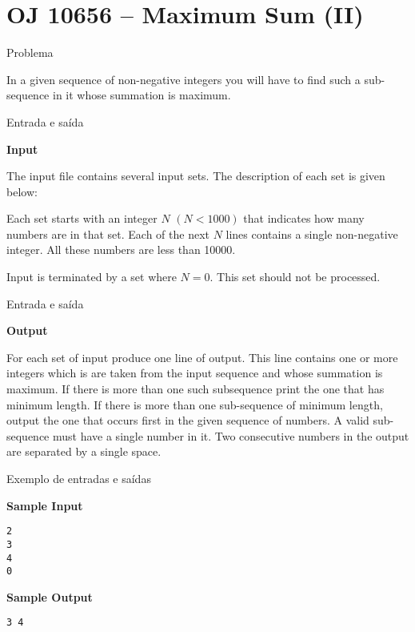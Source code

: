 \section{OJ 10656 -- Maximum Sum (II)}

\begin{frame}[fragile]{Problema}

In a given sequence of non-negative integers you will have to find such a sub-sequence in it whose
summation is maximum.

\end{frame}

\begin{frame}[fragile]{Entrada e saída}

\textbf{Input}

The input file contains several input sets. The description of each set is given below:

Each set starts with an integer $N$ $(N < 1000)$ that indicates how many numbers are in that set.
Each of the next $N$ lines contains a single non-negative integer. All these numbers are less 
than 10000.

Input is terminated by a set where $N = 0$. This set should not be processed.

\end{frame}

\begin{frame}[fragile]{Entrada e saída}

\textbf{Output}

For each set of input produce one line of output. This line contains one or more integers which is are
taken from the input sequence and whose summation is maximum. If there is more than one such subsequence print the one that has minimum length. If there is more than one sub-sequence of minimum
length, output the one that occurs first in the given sequence of numbers. A valid sub-sequence must
have a single number in it. Two consecutive numbers in the output are separated by a single space.

\end{frame}


\begin{frame}[fragile]{Exemplo de entradas e saídas}

\begin{minipage}[t]{0.6\textwidth}
\textbf{Sample Input}
\begin{verbatim}
2
3
4
0
\end{verbatim}
\end{minipage}
\begin{minipage}[t]{0.35\textwidth}
\textbf{Sample Output}
\begin{verbatim}
3 4
\end{verbatim}
\end{minipage}
\end{frame}

